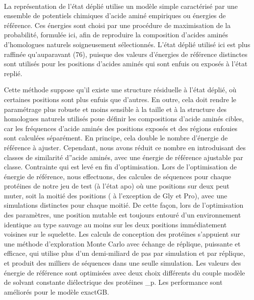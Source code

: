 \begin{enumarete}
\begin{enumerate}
\paragraph{}
La représentation de l'état déplié utilise un modèle simple caractérisé par une ensemble de potentiels chimiques d'acide aminé empiriques ou énergies de référence. Ces énergies sont choisi par une procédure de maximisation de la probabilité, formulée ici, afin de reproduire la composition d'acides aminés d'homologues naturels soigneusement sélectionnés. L'état déplié utilisé ici est plus raffinée qu'auparavant (76), puisque des valeurs d'énergies de référence distinctes sont utilisés pour les positions d'acides aminés qui sont enfuis ou exposés à l'état replié.  

Cette méthode suppose qu'il existe une structure résiduelle à l'état déplié, où certaines positions sont plus enfuis que d'autres. En outre, cela doit rendre le paramétrage plus robuste et moins sensible à la taille et à la structure des homologues naturels utilisés poue définir les compositions d'acide aminés cibles, car les fréquences d'acide aminés des positions exposés et des régions enfouies sont calculées séparément. En principe, cela double le nombre d'énergie de référence à ajuster. Cependant, nous avons réduit ce nombre en introduisant des classes de similarité d''acide aminés, avec une énergie de référence ajustable par classe. Contrainte qui est levé en fin d'optimisation. Lors de l'optimisation de énergie de référence, nous effectuons, des calcules de séquences pour chaque protéines de notre jeu de test (à l'état apo) où une positions sur deux  peut muter, soit la moitié des positions ( à l'exception de Gly et Pro), avec une simulations distinctes pour chaque moitié. De cette façon, lors de l'optimisation des paramètres, une position mutable est toujours entouré d'un environnement  identique au type sauvage au moins sur les deux positions immédiatement voisines sur le squelette. Les calculs de conception des protéines s'appuient sur une méthode d'exploration Monte Carlo avec échange de réplique, puissante et efficace, qui utilise plus d'un demi-miliard de pas par simulation et par réplique, et  produit des milliers de séquences dans une seulle simulation. Les valeurs des énergie de référence sont optimisées avec deux choix différents du couple modèle de solvant constante diélectrique des protéines \epsilon_p. Les performance sont améliorés pour le modèle exactGB.

\end{enumerate}
\end{enumarete}
